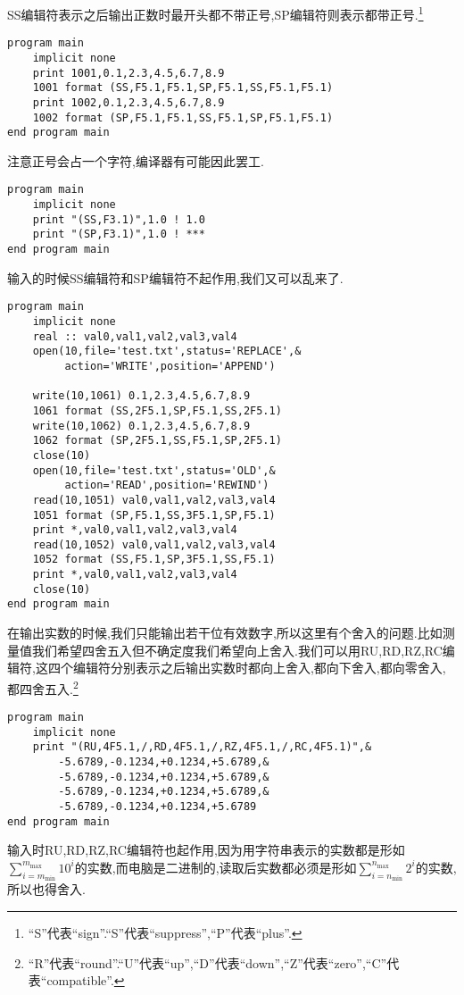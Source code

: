 SS编辑符表示之后输出正数时最开头都不带正号,SP编辑符则表示都带正号.\footnote{``S''代表``sign''.``S''代表``suppress'',``P''代表``plus''.}
\begin{lstlisting}
program main
    implicit none
    print 1001,0.1,2.3,4.5,6.7,8.9
    1001 format (SS,F5.1,F5.1,SP,F5.1,SS,F5.1,F5.1)
    print 1002,0.1,2.3,4.5,6.7,8.9
    1002 format (SP,F5.1,F5.1,SS,F5.1,SP,F5.1,F5.1)
end program main
\end{lstlisting}
注意正号会占一个字符,编译器有可能因此罢工.
\begin{lstlisting}
program main
    implicit none
    print "(SS,F3.1)",1.0 ! 1.0
    print "(SP,F3.1)",1.0 ! ***
end program main
\end{lstlisting}
输入的时候SS编辑符和SP编辑符不起作用,我们又可以乱来了.
\begin{lstlisting}
program main
    implicit none
    real :: val0,val1,val2,val3,val4
    open(10,file='test.txt',status='REPLACE',&
         action='WRITE',position='APPEND')

    write(10,1061) 0.1,2.3,4.5,6.7,8.9
    1061 format (SS,2F5.1,SP,F5.1,SS,2F5.1)
    write(10,1062) 0.1,2.3,4.5,6.7,8.9
    1062 format (SP,2F5.1,SS,F5.1,SP,2F5.1)
    close(10)
    open(10,file='test.txt',status='OLD',&
         action='READ',position='REWIND')
    read(10,1051) val0,val1,val2,val3,val4
    1051 format (SP,F5.1,SS,3F5.1,SP,F5.1)
    print *,val0,val1,val2,val3,val4
    read(10,1052) val0,val1,val2,val3,val4
    1052 format (SS,F5.1,SP,3F5.1,SS,F5.1)
    print *,val0,val1,val2,val3,val4
    close(10)
end program main
\end{lstlisting}

在输出实数的时候,我们只能输出若干位有效数字,所以这里有个舍入的问题.比如测量值我们希望四舍五入但不确定度我们希望向上舍入.我们可以用RU,RD,RZ,RC编辑符,这四个编辑符分别表示之后输出实数时都向上舍入,都向下舍入,都向零舍入,都四舍五入.\footnote{``R''代表``round''.``U''代表``up'',``D''代表``down'',``Z''代表``zero'',``C''代表``compatible''.}
\begin{lstlisting}
program main
    implicit none
    print "(RU,4F5.1,/,RD,4F5.1,/,RZ,4F5.1,/,RC,4F5.1)",&
        -5.6789,-0.1234,+0.1234,+5.6789,&
        -5.6789,-0.1234,+0.1234,+5.6789,&
        -5.6789,-0.1234,+0.1234,+5.6789,&
        -5.6789,-0.1234,+0.1234,+5.6789
end program main
\end{lstlisting}
输入时RU,RD,RZ,RC编辑符也起作用,因为用字符串表示的实数都是形如$\sum_{i=m_\text{min}}^{m_\text{max}}10^{i}$的实数,而电脑是二进制的,读取后实数都必须是形如$\sum_{i=n_\text{min}}^{n_\text{max}}2^{i}$的实数,所以也得舍入.

